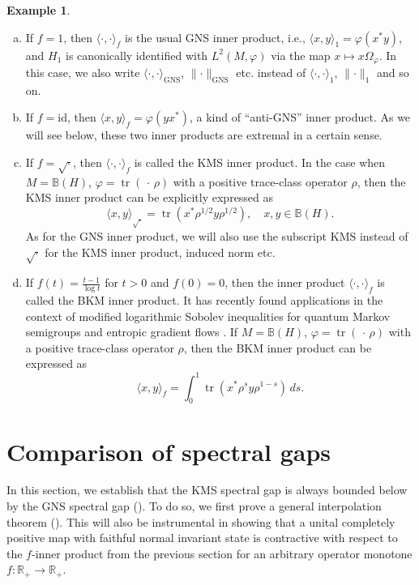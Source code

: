 \documentclass[a4paper,12pt]{amsart}
\newcommand{\ip}[2]{\langle#1,#2\rangle}
\newcommand{\norm}[1]{\lVert#1\rVert}
\newcommand{\id}{\mathrm{id}}
\renewcommand{\phi}{\varphi}
\newcommand{\IR}{\mathbb R}
\theoremstyle{plain}
\theoremstyle{remark}
\theoremstyle{definition}
\newtheorem{example}[proposition]{Example}
\begin{document}
\begin{example}
    \begin{enumerate}[(a)]
        \item If $f=1$, then $\ip\cdot\cdot_f$ is the usual GNS inner product, i.e., $\ip{x}{y}_1=\phi(x^\ast y)$, and $H_1$ is canonically identified with $L^2(M,\phi)$ via the map $x\mapsto x\Omega_\phi$. In this case, we also write $ \ip\cdot\cdot_{\mathrm{GNS}}$, $\norm\cdot_{\mathrm{GNS}}$ etc. instead of $\ip\cdot\cdot_{1}$, $\norm\cdot_{1}$ and so on.
        \item If $f=\id$, then $\ip{x}{y}_f=\phi(yx^\ast)$, a kind of ``anti-GNS'' inner product. As we will see below, these two inner products are extremal in a certain sense.
        \item If $f=\sqrt\cdot$, then $\ip\cdot\cdot_f$ is called the KMS inner product. In the case when $M=\mathbb B(H)$, $\phi=\operatorname{tr}(\,\cdot\,\rho)$ with a positive trace-class operator $\rho$, then the KMS inner product can be explicitly expressed as
        \begin{equation*}
            \ip{x}{y}_{\sqrt\cdot}=\operatorname{tr}(x^\ast\rho^{1/2}y\rho^{1/2}),\quad x,y\in \mathbb B(H).
        \end{equation*}
        As for the GNS inner product, we will also use the subscript $\mathrm{KMS}$ instead of $\sqrt\cdot$ for the KMS inner product, induced norm etc.
        \item If $f(t)=\frac{t-1}{\log t}$ for $t>0$ and $f(0)=0$, then the inner product $\ip\cdot\cdot_f$ is called the BKM inner product. It has recently found applications in the context of modified logarithmic Sobolev inequalities for quantum Markov semigroups and entropic gradient flows \cite{CM20,BM24}. If $M=\mathbb B(H)$, $\phi=\operatorname{tr}(\,\cdot\,\rho)$ with a positive trace-class operator $\rho$, then the BKM inner product can be expressed as
        \begin{equation*}
            \ip{x}{y}_f=\int_0^1 \operatorname{tr}(x^\ast\rho^s y\rho^{1-s})\,ds.
        \end{equation*}
    \end{enumerate}    
\end{example}

\section{Comparison of spectral gaps}\label{sec:comparison}

In this section, we establish that the KMS spectral gap is always bounded below by the GNS spectral gap (). To do so, we first prove a general interpolation theorem (). This will also be instrumental in showing that a unital completely positive map with faithful normal invariant state is contractive with respect to the $f$-inner product from the previous section for an arbitrary operator monotone $f\colon\IR_+\to\IR_+$.
\end{document}
